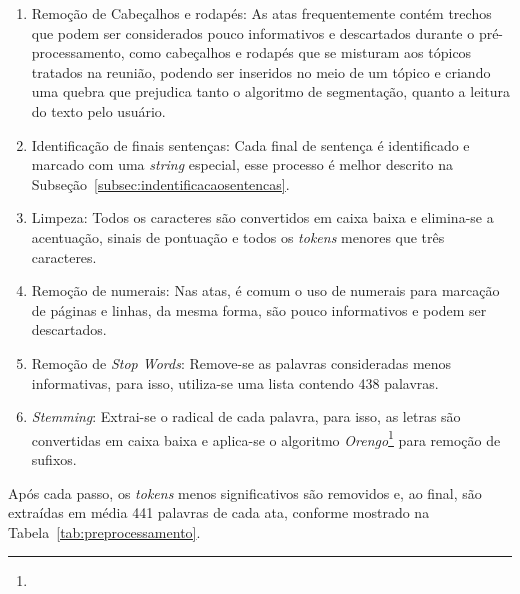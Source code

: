 \begin{enumerate}


\item Remoção de Cabeçalhos e rodapés: 
As atas frequentemente contém trechos que podem ser considerados pouco informativos e descartados durante o pré-processamento, como cabeçalhos e rodapés que se misturam aos tópicos tratados na reunião, podendo ser  inseridos no meio de um tópico e criando uma quebra que prejudica tanto o algoritmo de segmentação, quanto a leitura do texto pelo usuário.

\item Identificação de finais sentenças: 
Cada final de sentença é identificado e marcado com uma \textit{string} especial, esse processo é melhor descrito na Subseção~\ref{subsec:indentificacaosentencas}.

\item Limpeza: 
Todos os caracteres são convertidos em caixa baixa e elimina-se a acentuação, sinais de pontuação e todos os \textit{tokens} menores que três caracteres.

\item Remoção de numerais:
Nas atas, é comum o uso de numerais para marcação de páginas e linhas, da mesma forma, são pouco informativos e podem ser descartados.

\item Remoção de \textit{Stop Words}: 
Remove-se as palavras consideradas menos informativas, para isso, utiliza-se uma lista contendo 438 palavras. 

\item \textit{Stemming}:
Extrai-se o radical de cada palavra, para isso, as letras são convertidas em caixa baixa e aplica-se o algoritmo \textit{Orengo}\footnote{\urlorengo} para remoção de sufixos.

\end{enumerate}
	
	

Após cada passo, os \textit{tokens} menos significativos são removidos e, ao final, são extraídas em média 441 palavras de cada ata, conforme mostrado na Tabela~\ref{tab:preprocessamento}.

%
%
%
%
%
%


